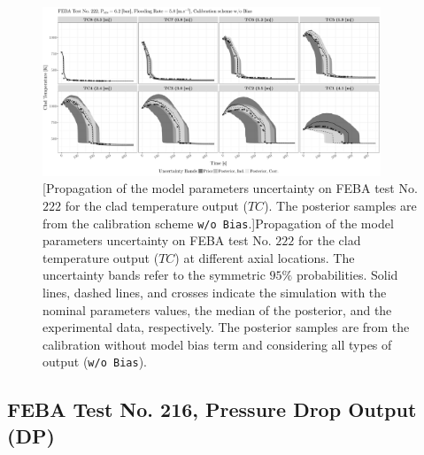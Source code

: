 \clearpage
\begin{figure}
	\centering
	\includegraphics[width=0.90\textwidth]{../figures/chapter5/figures/plotTraceUQPosteriorAllNoDiscNoBCTC222}
		[Propagation of the model parameters uncertainty on FEBA test No. $222$ for the clad temperature output ($TC$). The posterior samples are from the calibration scheme \texttt{w/o Bias}.]{Propagation of the model parameters uncertainty on FEBA test No. $222$ for the clad temperature output ($TC$) at different axial locations. The uncertainty bands refer to the symmetric $95\%$ probabilities. Solid lines, dashed lines, and crosses indicate the simulation with the nominal parameters values, the median of the posterior, and the experimental data, respectively. The posterior samples are from the calibration without model bias term and considering all types of output (\texttt{w/o Bias}).}
	\label{fig:ch5_plot_trace_uq_post_tc_222_nodisc}
\end{figure}
\clearpage

\subsection{FEBA Test No. 216, Pressure Drop Output (DP)}\label{app:tbl_results_uq_post_dp_216}

